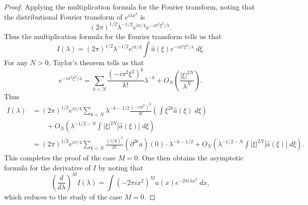 %
%
%
%
%
\begin{proof}
  Applying the multiplication formula for the Fourier transform, noting that the distributional Fourier transform of $e^{i \lambda x^2}$ is
  \[ (2 \pi)^{1/2} \lambda^{-1/2} e^{i \pi / 4} e^{-i \pi^2 \xi^2 / \lambda}. \]
  Thus the multiplication formula for the Fourier transform tells us that
  \[ I(\lambda) = (2 \pi)^{1/2} \lambda^{-1/2} e^{i \pi / 4} \int \widehat{a}(\xi) e^{-i \pi^2 \xi^2 / \lambda}\; d\xi. \]
  For any $N > 0$, Taylor's theorem tells us that
  \[ e^{-i \pi^2 \xi^2 / \lambda} = \sum_{k < N} \frac{(-i \pi^2 \xi^2)^k}{k!} \lambda^{-k} + O_N \left( \frac{|\xi|^{2N}}{\lambda^{N}} \right). \]
  Thus
  \begin{align*}
    I(\lambda) &= (2\pi)^{1/2} e^{i \pi / 4} \sum_{k < N} \lambda^{-k-1/2} \frac{(-i \pi^2)^k}{k!} \left( \int \xi^{2k} \widehat{a}(\xi)\; d\xi \right)\\
    &\quad\quad + O_N( \lambda^{-1/2 - N} \int |\xi|^{2N} |\widehat{a}(\xi)|\; d\xi )\\
    &= (2 \pi)^{1/2} e^{i \pi / 4} \sum_{k < N} \frac{(i/4)^k}{k!} (\partial^{2k} a)(0) \cdot \lambda^{-k-1/2} + O_N \left( \lambda^{-1/2 - N} \int |\xi|^{2N} |\widehat{a}(\xi)| \; d \xi \right).
  \end{align*}
  This completes the proof of the case $M = 0$. One then obtains the asymptotic formula for the derivative of $I$ by noting that
  \[ \left( \frac{d}{d\lambda} \right)^M I(\lambda) = \int (-2 \pi i x^2)^M a(x) e^{-2 \pi i \lambda x^2}\; dx, \]
  which reduces to the study of the case $M = 0$.
\end{proof}

